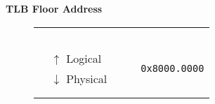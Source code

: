 \documentclass{beamer}
\begin{document}
\begin{frame}
\begin{center}
\begin{block}{\textbf{{\small TLB Floor Address}}}
\begin{minipage}{0.65\textwidth}
\begin{figure}[h]
\begin{tabular}{rrrcl}
						                                                  &                                                   & \multicolumn{1}{r|}{}                              & \multicolumn{1}{c|}{\cellcolor{nord13}}                   &                                               \\
						                                                  &                                                   & \multicolumn{1}{r|}{}                              & \multicolumn{1}{c|}{\cellcolor{nord13}}                   &                                               \\
						                                                  &                                                   & \multicolumn{1}{r|}{}                              & \multicolumn{1}{c|}{\cellcolor{nord13}}                   &                                               \\
						                                                  &                                                   & \multicolumn{1}{r|}{}                              & \multicolumn{1}{c|}{\cellcolor{nord13}}                   &                                               \\
						                                                  &                                                   & \multicolumn{1}{r|}{}                              & \multicolumn{1}{c|}{\cellcolor{nord13}}                   &                                               \\
						                                                  & \multicolumn{1}{l}{{\tiny $\uparrow$ Logical}}    & \multicolumn{1}{r|}{}                              & \multicolumn{1}{c|}{\multirow{-8}{*}{\cellcolor{nord13}}} & \multirow{2}{*}{\texttt{{\tiny 0x8000.0000}}} \\ \hhline{~---~}
						                                                  & \multicolumn{1}{l}{{\tiny $\downarrow$ Physical}} & \multicolumn{1}{r|}{}                              & \multicolumn{1}{c|}{\cellcolor{nord12}}                   &                                               \\
						                                                  &                                                   & \multicolumn{1}{r|}{}                              & \multicolumn{1}{c|}{\cellcolor{nord12}}                   &                                               \\
						                                                  &                                                   & \multicolumn{1}{r|}{}                              & \multicolumn{1}{c|}{\cellcolor{nord12}}                   &                                               \\

\end{tabular}
\end{figure}
\end{minipage}
\end{block}
\end{center}
\end{frame}
\end{document}
